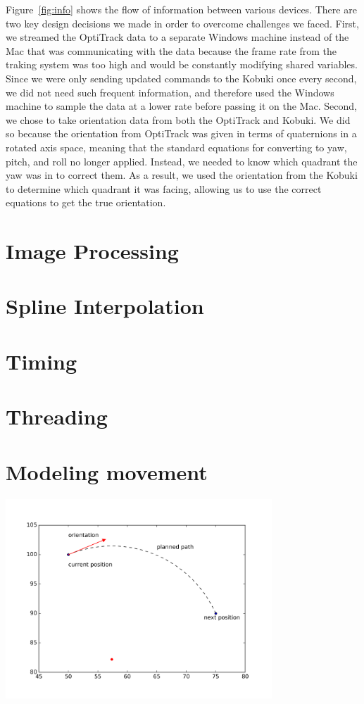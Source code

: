 \documentclass[10pt]{article}
\newenvironment{Figure}
  {\par\medskip\noindent\minipage{\linewidth}}
  {\endminipage\par\medskip}
\begin{document}
\begin{multicols}{2}
  Figure~\ref{fig:info} shows the flow of information between various devices.
  There are two key design decisions we made in order to overcome challenges we
  faced. First, we streamed the OptiTrack data to a separate Windows machine
  instead of the Mac that was communicating with the data because the frame rate
  from the traking system was too high and would be constantly modifying shared
  variables. Since we were only sending updated commands to the Kobuki once
  every second, we did not need such frequent information, and therefore used
  the Windows machine to sample the data at a lower rate before passing it on
  the Mac. Second, we chose to take orientation data from both the OptiTrack and
  Kobuki. We did so because the orientation from OptiTrack was given in terms of
  quaternions in a rotated axis space, meaning that the standard equations for
  converting to yaw, pitch, and roll no longer applied. Instead, we needed to
  know which quadrant the yaw was in to correct them. As a result, we used the
  orientation from the Kobuki to determine which quadrant it was facing,
  allowing us to use the correct equations to get the true orientation.

  \section*{Image Processing}

  \section*{Spline Interpolation}

  \section*{Timing}

  \section*{Threading}

  \section*{Modeling movement}
  \begin{Figure}
    \includegraphics[width=10cm]{../plots/roc.png}
     \label{fig:roc}
  \end{Figure}


\end{multicols}
\end{document}
